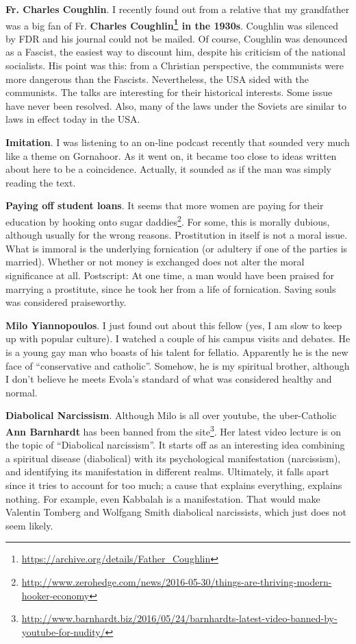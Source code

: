\textbf{Fr. Charles Coughlin}. I recently found out from a relative that my grandfather was a big fan of Fr. \textbf{Charles Coughlin\footnote{\url{https://archive.org/details/Father\_Coughlin}} in the 1930s}. Coughlin was silenced by FDR and his journal could not be mailed. Of course, Coughlin was denounced as a Fascist, the easiest way to discount him, despite his criticism of the national socialists. His point was this: from a Christian perspective, the communists were more dangerous than the Fascists. Nevertheless, the USA sided with the communists. The talks are interesting for their historical interests. Some issue have never been resolved. Also, many of the laws under the Soviets are similar to laws in effect today in the USA.

\textbf{Imitation}. I was listening to an on-line podcast recently that sounded very much like a theme on Gornahoor. As it went on, it became too close to ideas written about here to be a coincidence. Actually, it sounded as if the man was simply reading the text.

\textbf{Paying off student loans}. It seems that more women are paying for their education by hooking onto sugar daddies\footnote{\url{http://www.zerohedge.com/news/2016-05-30/things-are-thriving-modern-hooker-economy}}. For some, this is morally dubious, although usually for the wrong reasons. Prostitution in itself is not a moral issue. What is immoral is the underlying fornication (or adultery if one of the parties is married). Whether or not money is exchanged does not alter the moral significance at all. Postscript: At one time, a man would have been praised for marrying a prostitute, since he took her from a life of fornication. Saving souls was considered praiseworthy.

\textbf{Milo Yiannopoulos}. I just found out about this fellow (yes, I am slow to keep up with popular culture). I watched a couple of his campus visits and debates. He is a young gay man who boasts of his talent for fellatio. Apparently he is the new face of ``conservative and catholic''. Somehow, he is my spiritual brother, although I don't believe he meets Evola's standard of what was considered healthy and normal.

\textbf{Diabolical Narcissism}. Although Milo is all over youtube, the uber-Catholic \textbf{Ann Barnhardt} has been banned from the site\footnote{\url{http://www.barnhardt.biz/2016/05/24/barnhardts-latest-video-banned-by-youtube-for-nudity/}}. Her latest video lecture is on the topic of ``Diabolical narcissism''. It starts off as an interesting idea combining a spiritual disease (diabolical) with its psychological manifestation (narcissism), and identifying its manifestation in different realms. Ultimately, it falls apart since it tries to account for too much; a cause that explains everything, explains nothing. For example, even Kabbalah is a manifestation. That would make Valentin Tomberg and Wolfgang Smith diabolical narcissists, which just does not seem likely.


